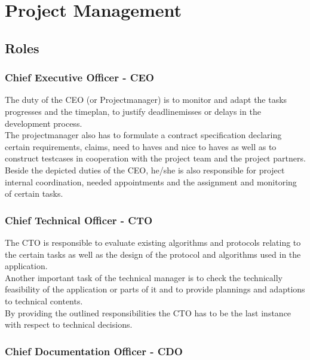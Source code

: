 
\section{Project Management}

\subsection{Roles}

\subsubsection{Chief Executive Officer - CEO}
\label{sec:pm:roles:ceo}
The duty of the CEO (or Projectmanager) is to monitor and adapt the tasks progresses and the timeplan, 
to justify deadlinemisses or delays in the development process.\\

The projectmanager also has to formulate a contract specification declaring certain requirements, 
claims, need to haves and nice to haves as well as to construct testcases in cooperation with the project 
team and the project partners.\\

Beside the depicted duties of the CEO, he/she is also responsible for project internal coordination, 
needed appointments and the assignment and monitoring of certain tasks.\\

\subsubsection{Chief Technical Officer - CTO}
\label{sec:pm:roles:cto}
The CTO is responsible to evaluate existing algorithms and protocols relating to the certain 
tasks as well as the design of the protocol and algorithms used in the application.\\

Another important task of the technical manager is to check the technically feasibility 
of the application or parts of it and to provide plannings and adaptions to technical contents.\\

By providing the outlined responsibilities the CTO has to be the last instance with respect to technical decisions.\\


\subsubsection{Chief Documentation Officer - CDO}
\label{sec:pm:roles:cdo}

